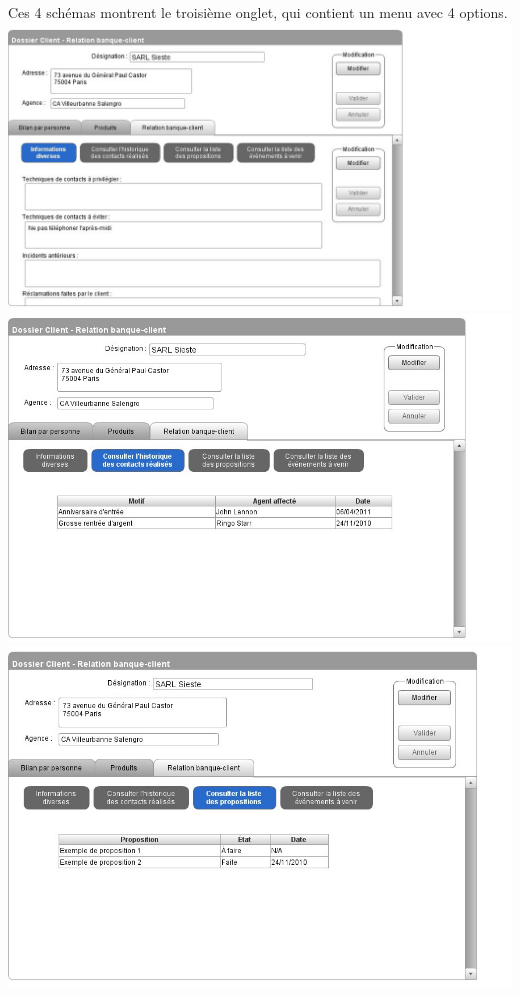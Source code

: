 		\paragraph*{}
		Ces 4 schémas montrent le troisième onglet, qui contient un menu avec 4 options. \\
		\includegraphics[width=\linewidth]{IHM/IHMclient3.jpg} \\
		\includegraphics[width=\linewidth]{IHM/IHMclient4.jpg} \\
		\includegraphics[width=\linewidth]{IHM/IHMclient5.jpg} \\

